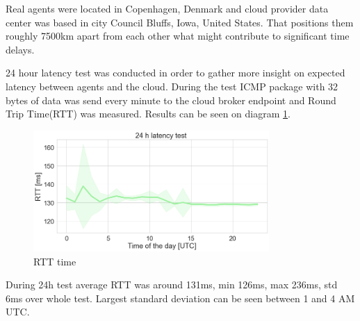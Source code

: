 Real agents were located in Copenhagen, Denmark and cloud provider data center was based in city Council Bluffs, Iowa, United States. That positions them roughly 7500km apart from each other what might contribute to significant time delays.

24 hour latency test was conducted in order to gather more insight on expected latency between agents and the cloud. During the test ICMP package with 32 bytes of data was send every minute to the cloud broker endpoint and Round Trip Time(RTT) was measured. Results can be seen on diagram \ref{fig:ping}.

\begin{figure}[H]
    \centering
    \includegraphics[width=0.8\textwidth]{pictures/ping.png}
    \caption{ RTT time }
    \label{fig:ping}
\end{figure}

During 24h test average RTT was around 131ms, min 126ms, max 236ms, std 6ms over whole test. Largest standard deviation can be seen between 1 and 4 AM UTC.
